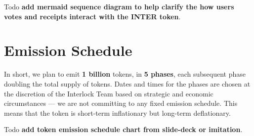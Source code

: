 \documentclass[a4paper]{article}
\begin{document}
Todo \textbf{add mermaid sequence diagram to help clarify the how users votes and receipts interact with the INTER token}.
\section{Emission Schedule}
\label{Emission Schedule}

In short, we plan to emit \textbf{1 billion} tokens, in \textbf{5 phases}, each subsequent phase doubling the total supply of tokens. Dates and times for the phases are chosen at the discretion of the Interlock Team based on strategic and economic circumstances ---  we are not committing to any fixed emission schedule. This means that the token is short-term inflationary but long-term deflationary.

Todo \textbf{add token emission schedule chart from slide-deck or imitation}.
\end{document}
